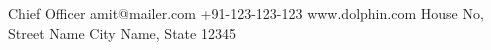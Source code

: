 \documentclass{../src-tex/amm-pst-business-card}
\begin{document}
%
\thispagestyle{empty}%
%
{Chief Officer}%
{amit@mailer.com}%
{+91-123-123-123}%
{www.dolphin.com}%
{House No, Street Name}%
{City Name, State 12345}%
\end{document}
